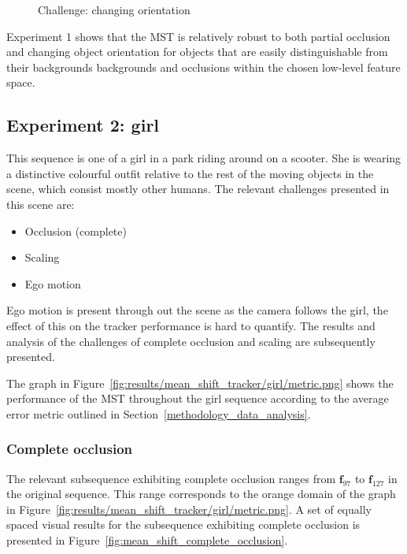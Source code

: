 \begin{figure}
{\begin{tabular}{cccc}
        \end{tabular}}
    \caption{Challenge: changing orientation\label{fig:mean_shift_orientation}
 }
\end{figure}

Experiment 1 shows that the MST is relatively robust to both partial occlusion and changing
object orientation for objects that are easily distinguishable from their
backgrounds backgrounds and occlusions within the chosen low-level feature space.

\subsection{Experiment 2: girl}
This sequence is one of a girl in a park riding around on a scooter. She is
wearing a distinctive colourful outfit relative to the rest of the moving objects in the
scene, which consist mostly other humans.
The relevant challenges presented in this scene are:
\begin{itemize}
    \item Occlusion (complete)
    \item Scaling 
    \item Ego motion  
\end{itemize}

Ego motion is present through out the scene as the camera follows the girl, the
effect of this on the tracker performance is hard to quantify. The results and
analysis of the challenges of complete occlusion and scaling are subsequently
presented.

The graph in Figure~\ref{fig:results/mean_shift_tracker/girl/metric.png} shows the
performance of the MST throughout the girl sequence according to the average error metric outlined in
Section~\ref{methodology_data_analysis}.  


\subsubsection{Complete occlusion}
The relevant subsequence exhibiting complete occlusion ranges from $\mathbf{f}_{97}$ to
$\mathbf{f}_{127}$ in the original sequence. This range corresponds to 
the orange domain of the graph in
Figure~\ref{fig:results/mean_shift_tracker/girl/metric.png}. 
A set of equally spaced visual results for the subsequence exhibiting complete occlusion
is presented in Figure~\ref{fig:mean_shift_complete_occlusion}.

